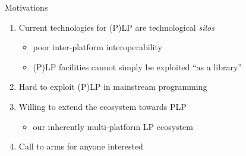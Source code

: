 \documentclass[presentation]{beamer}\mode<presentation>{\usetheme{AMSBolognaFC}}
\begin{document}
\begin{frame}[c]{Motivations}

    \begin{enumerate}
        \item Current technologies for (P)LP are \alert{technological \emph{silos}}
        \begin{itemize}
            \item poor \alert{inter-platform} interoperability
            \item (P)LP facilities cannot simply be exploited \alert{``as a library''}
        \end{itemize}

        \bigskip

        \item Hard to exploit (P)LP in mainstream programming

        \bigskip

        \item Willing to extend the \twopkt{} ecosystem towards PLP
        \begin{itemize}
            \item our inherently multi-platform LP ecosystem
        \end{itemize}

        \bigskip

        \item Call to arms for anyone interested

    \end{enumerate}

\end{frame}
\end{document}
